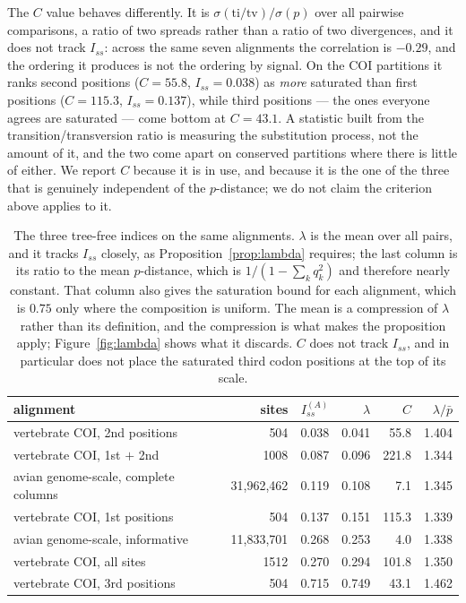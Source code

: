 \documentclass[11pt]{article}
\newcommand{\Iss}{I_{ss}}
\theoremstyle{definition}
\theoremstyle{remark}
\begin{document}
The $C$ value behaves differently. It is
$\sigma(\mathrm{ti/tv})/\sigma(p)$ over all pairwise comparisons, a ratio of
two spreads rather than a ratio of two divergences, and it does not track
$\Iss$: across the same seven alignments the correlation is $-0.29$, and the
ordering it produces is not the ordering by signal. On the COI partitions it
ranks second positions ($C=55.8$, $\Iss=0.038$) as \emph{more} saturated than
first positions ($C=115.3$, $\Iss=0.137$), while third positions --- the ones
everyone agrees are saturated --- come bottom at $C=43.1$. A statistic built
from the transition/transversion ratio is measuring the substitution process,
not the amount of it, and the two come apart on conserved partitions where
there is little of either. We report $C$ because it is in use, and because it
is the one of the three that is genuinely independent of the $p$-distance; we
do not claim the criterion above applies to it.

\begin{table}[t]
\centering
\small
\setlength{\tabcolsep}{5pt}
\begin{tabular}{lrrrrr}
\toprule
alignment & sites & $\Iss^{(A)}$ & $\lambda$ & $C$
          & $\lambda/\bar p$ \\
\midrule
vertebrate COI, 2nd positions        & 504        & 0.038 & 0.041 & 55.8  & 1.404 \\
vertebrate COI, 1st $+$ 2nd          & 1008       & 0.087 & 0.096 & 221.8 & 1.344 \\
avian genome-scale, complete columns & 31,962,462 & 0.119 & 0.108 & 7.1   & 1.345 \\
vertebrate COI, 1st positions        & 504        & 0.137 & 0.151 & 115.3 & 1.339 \\
avian genome-scale, informative      & 11,833,701 & 0.268 & 0.253 & 4.0   & 1.338 \\
vertebrate COI, all sites            & 1512       & 0.270 & 0.294 & 101.8 & 1.350 \\
vertebrate COI, 3rd positions        & 504        & 0.715 & 0.749 & 43.1  & 1.462 \\
\bottomrule
\end{tabular}
\caption{The three tree-free indices on the same alignments. $\lambda$ is the
mean over all pairs, and it tracks $\Iss$ closely, as
Proposition~\ref{prop:lambda} requires; the last column is its ratio to the
mean $p$-distance, which is $1/(1-\sum_kq_k^2)$ and therefore nearly constant.
That column also gives the saturation bound for each alignment, which is
$0.75$ only where the composition is uniform. The mean is a compression of
$\lambda$ rather than its definition, and the compression is what makes the
proposition apply; Figure~\ref{fig:lambda} shows what it discards. $C$ does
not track $\Iss$, and in particular does not place the saturated third codon
positions at the top of its scale.}
\label{tab:indices}
\end{table}
\end{document}
